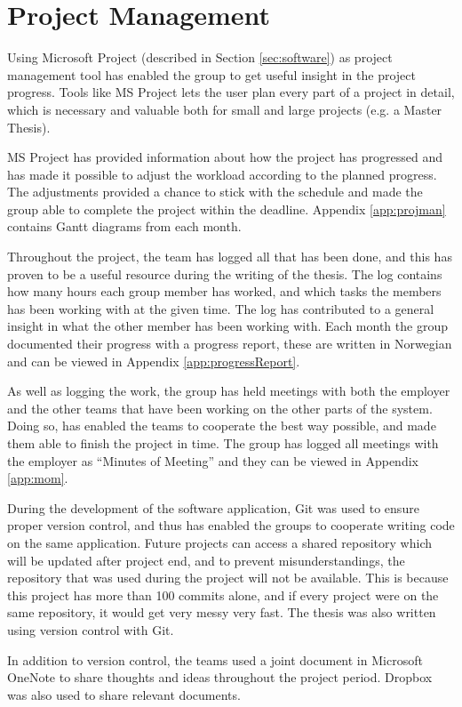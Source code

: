 \chapter{Project Management}
\label{cha:projectmanagement}
Using Microsoft Project (described in Section \ref{sec:software}) as project management tool has enabled the group to get useful insight in the project progress. Tools like MS Project lets the user plan every part of a project in detail, which is necessary and valuable both for small and large projects (e.g. a Master Thesis).

MS Project has provided information about how the project has progressed and has made it possible to adjust the workload according to the planned progress. The adjustments provided a chance to stick with the schedule and made the group able to complete the project within the deadline. Appendix \ref{app:projman} contains Gantt diagrams from each month.

Throughout the project, the team has logged all that has been done, and this has proven to be a useful resource during the writing of the thesis. The log contains how many hours each group member has worked, and which tasks the members has been working with at the given time. The log has contributed to a general insight in what the other member has been working with. Each month the group documented their progress with a progress report, these are written in Norwegian and can be viewed in Appendix \ref{app:progressReport}.

As well as logging the work, the group has held meetings with both the employer and the other teams that have been working on the other parts of the system. Doing so, has enabled the teams to cooperate the best way possible, and made them able to finish the project in time. The group has logged all meetings with the employer as ``Minutes of Meeting'' and they can be viewed in Appendix \ref{app:mom}.

During the development of the software application, Git was used to ensure proper version control, and thus has enabled the groups to cooperate writing code on the same application. Future projects can access a shared repository which will be updated after project end, and to prevent misunderstandings, the repository that was used during the project will not be available. This is because this project has more than 100 commits alone, and if every project were on the same repository, it would get very messy very fast. The thesis was also written using version control with Git.

In addition to version control, the teams used a joint document in Microsoft OneNote to share thoughts and ideas throughout the project period. Dropbox was also used to share relevant documents.
